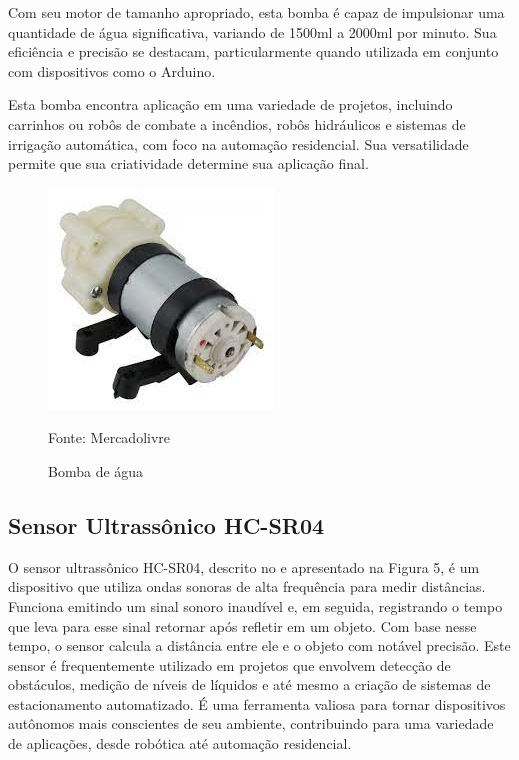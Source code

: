 Com seu motor de tamanho apropriado, esta bomba é capaz de impulsionar uma quantidade de água significativa, variando de 1500ml a 2000ml por minuto. Sua eficiência e precisão se destacam, particularmente quando utilizada em conjunto com dispositivos como o Arduino.

Esta bomba encontra aplicação em uma variedade de projetos, incluindo carrinhos ou robôs de combate a incêndios, robôs hidráulicos e sistemas de irrigação automática, com foco na automação residencial. Sua versatilidade permite que sua criatividade determine sua aplicação final.

\begin{figure}[H]
    \caption{Bomba de água}
    \label{fig:bombaImagem}
    \begin{center}
        
        \includegraphics[scale=1]{Textuais/imagens/bomba.png}
        
        Fonte: Mercadolivre
    \end{center}
\end{figure}

\subsection{Sensor Ultrassônico HC-SR04} O sensor ultrassônico HC-SR04, descrito no \cite{sensor} e apresentado na Figura 5, é um dispositivo que utiliza ondas sonoras de alta frequência para medir distâncias. Funciona emitindo um sinal sonoro inaudível e, em seguida, registrando o tempo que leva para esse sinal retornar após refletir em um objeto. Com base nesse tempo, o sensor calcula a distância entre ele e o objeto com notável precisão. Este sensor é frequentemente utilizado em projetos que envolvem detecção de obstáculos, medição de níveis de líquidos e até mesmo a criação de sistemas de estacionamento automatizado. É uma ferramenta valiosa para tornar dispositivos autônomos mais conscientes de seu ambiente, contribuindo para uma variedade de aplicações, desde robótica até automação residencial.

